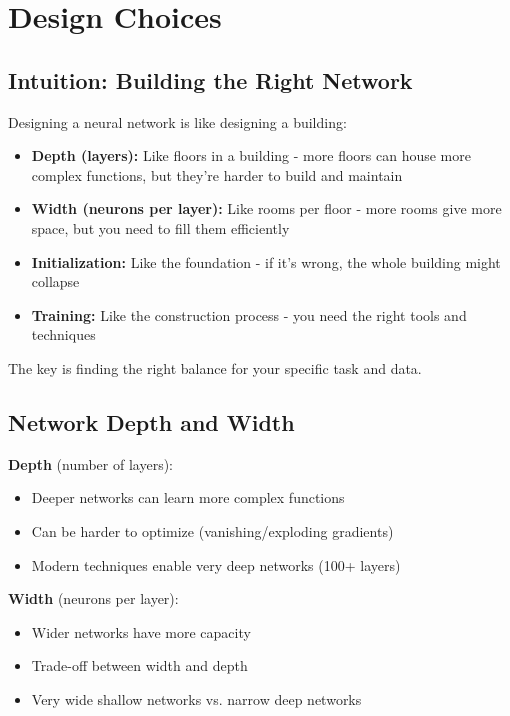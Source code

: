 
\section{Design Choices }
\label{sec:design-choices}

\subsection{Intuition: Building the Right Network}

Designing a neural network is like designing a building:
\begin{itemize}
    \item \textbf{Depth (layers):} Like floors in a building - more floors can house more complex functions, but they're harder to build and maintain
    \item \textbf{Width (neurons per layer):} Like rooms per floor - more rooms give more space, but you need to fill them efficiently
    \item \textbf{Initialization:} Like the foundation - if it's wrong, the whole building might collapse
    \item \textbf{Training:} Like the construction process - you need the right tools and techniques
\end{itemize}

The key is finding the right balance for your specific task and data.

\subsection{Network Depth and Width}

\textbf{Depth} (number of layers):
\begin{itemize}
    \item Deeper networks can learn more complex functions
    \item Can be harder to optimize (vanishing/exploding gradients)
    \item Modern techniques enable very deep networks (100+ layers)
\end{itemize}

\textbf{Width} (neurons per layer):
\begin{itemize}
    \item Wider networks have more capacity
    \item Trade-off between width and depth
    \item Very wide shallow networks vs. narrow deep networks
\end{itemize}


